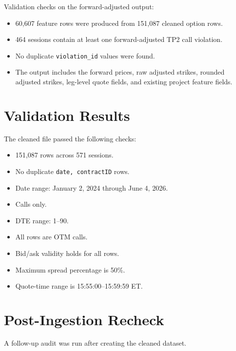 \documentclass[11pt]{article}
\begin{document}
Validation checks on the forward-adjusted output:

\begin{itemize}
  \item 60,607 feature rows were produced from 151,087 cleaned option rows.
  \item 464 sessions contain at least one forward-adjusted TP2 call violation.
  \item No duplicate \texttt{violation\_id} values were found.
  \item The output includes the forward prices, raw adjusted strikes, rounded
  adjusted strikes, leg-level quote fields, and existing project feature fields.
\end{itemize}

\section*{Validation Results}

The cleaned file passed the following checks:

\begin{itemize}
  \item 151,087 rows across 571 sessions.
  \item No duplicate \texttt{date, contractID} rows.
  \item Date range: January 2, 2024 through June 4, 2026.
  \item Calls only.
  \item DTE range: 1--90.
  \item All rows are OTM calls.
  \item Bid/ask validity holds for all rows.
  \item Maximum spread percentage is 50\%.
  \item Quote-time range is 15:55:00--15:59:59 ET.
\end{itemize}

\section*{Post-Ingestion Recheck}

A follow-up audit was run after creating the cleaned dataset.
\end{document}
